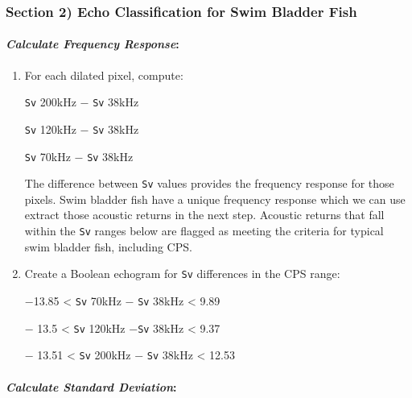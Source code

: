 \documentclass[
  letterpaper,
  oneside,
  open=any]{scrbook}
\let\oldparagraph\paragraph
\renewcommand{\paragraph}[1]{\oldparagraph{#1}\mbox{}}
\begin{document}
\subsubsection{\texorpdfstring{\textbf{Section 2) Echo Classification
for Swim Bladder
Fish}}{Section 2) Echo Classification for Swim Bladder Fish}}\label{section-2-echo-classification-for-swim-bladder-fish}

\paragraph{\texorpdfstring{\emph{Calculate Frequency
Response}:}{Calculate Frequency Response:}}\label{calculate-frequency-response}

\begin{enumerate}
\def\labelenumi{\arabic{enumi}.}
\item
  For each dilated pixel, compute:

  \texttt{Sv} 200kHz − \texttt{Sv} 38kHz

  \texttt{Sv} 120kHz − \texttt{Sv} 38kHz

  \texttt{Sv} 70kHz − \texttt{Sv} 38kHz

  The difference between \texttt{Sv} values provides the frequency
  response for those pixels. Swim bladder fish have a unique frequency
  response which we can use extract those acoustic returns in the next
  step. Acoustic returns that fall within the \texttt{Sv} ranges below
  are flagged as meeting the criteria for typical swim bladder fish,
  including CPS.
\item
  Create a Boolean echogram for \texttt{Sv} differences in the CPS
  range:

  −13.85 \textless{} \texttt{Sv} 70kHz − \texttt{Sv} 38kHz \textless{}
  9.89

  − 13.5 \textless{} \texttt{Sv} 120kHz −\texttt{Sv} 38kHz \textless{}
  9.37

  − 13.51 \textless{} \texttt{Sv} 200kHz − \texttt{Sv} 38kHz \textless{}
  12.53
\end{enumerate}

\paragraph{\texorpdfstring{\emph{Calculate Standard
Deviation}:}{Calculate Standard Deviation:}}\label{calculate-standard-deviation}
\end{document}
